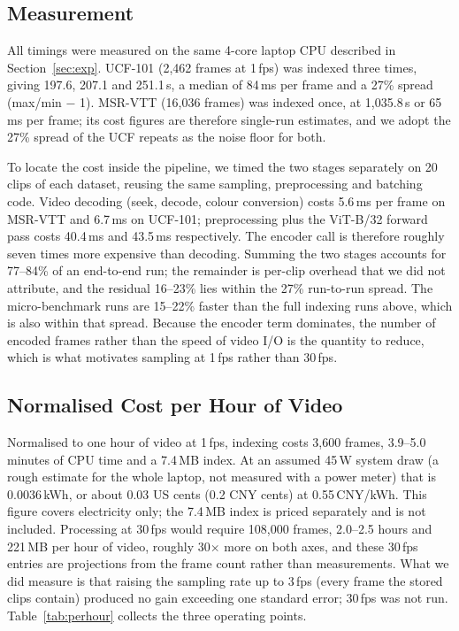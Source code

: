 \documentclass[journal]{IEEEtran}
\begin{document}
\subsection{Measurement}\label{sec:measure}
All timings were measured on the same 4-core laptop CPU described in Section~\ref{sec:exp}.
UCF-101 (2{,}462 frames at 1\,fps) was indexed three times, giving 197.6, 207.1 and 251.1\,s, a
median of 84\,ms per frame and a 27\% spread (max/min $-$ 1). MSR-VTT (16{,}036 frames) was indexed once, at
1{,}035.8\,s or 65\,ms per frame; its cost figures are therefore single-run estimates, and we
adopt the 27\% spread of the UCF repeats as the noise floor for both.

To locate the cost inside the pipeline, we timed the two stages separately on 20 clips of each
dataset, reusing the same sampling, preprocessing and batching code. Video decoding (seek,
decode, colour conversion) costs 5.6\,ms per frame on MSR-VTT and 6.7\,ms on UCF-101;
preprocessing plus the ViT-B/32 forward pass costs 40.4\,ms and 43.5\,ms respectively. The
encoder call is therefore roughly seven times more expensive than decoding. Summing the two stages
accounts for 77--84\% of an end-to-end run; the remainder is per-clip overhead that we did not
attribute, and the residual 16--23\% lies within the 27\% run-to-run spread. The micro-benchmark runs are 15--22\% faster
than the full indexing runs above, which is also within that spread. Because the encoder term
dominates, the number of encoded frames rather than the speed of video I/O is the quantity to
reduce, which is what motivates sampling at 1\,fps rather than 30\,fps.

\subsection{Normalised Cost per Hour of Video}
Normalised to one hour of video at 1\,fps, indexing costs 3{,}600 frames, 3.9--5.0 minutes of
CPU time and a 7.4\,MB index. At an assumed 45\,W system draw (a rough
estimate for the whole laptop, not measured with a power meter) that is 0.0036\,kWh, or about
0.03 US cents (0.2 CNY cents) at 0.55\,CNY/kWh. This figure covers electricity only; the
7.4\,MB index is priced separately and is not included. Processing at 30\,fps would require
108{,}000 frames, 2.0--2.5 hours and 221\,MB per hour of video, roughly 30$\times$ more on both
axes, and these 30\,fps entries are projections from the frame count rather than measurements.
What we did measure is that raising the sampling rate up to 3\,fps (every frame the stored clips contain) produced no gain exceeding
one standard error; 30\,fps was not run. Table~\ref{tab:perhour} collects the three operating
points.
\end{document}
